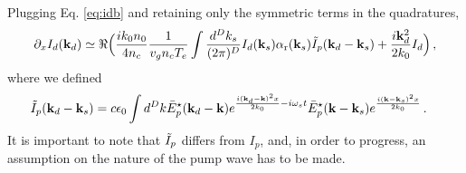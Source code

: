 \documentclass[
 reprint,
 amsmath,amssymb,
 aps,
]{revtex4-1}
\begin{document}
\begin{widetext}
Plugging Eq. \eqref{eq:idb} and retaining only the symmetric terms in the quadratures, 
\begin{align}
\partial_xI_d(\mathbf{k}_d)\simeq \Re\Big( \frac{ik_0n_0}{4n_c} \frac{1 }{  v_g n_c T_e}    \int \frac{d^Dk_s}{(2\pi)^D} I_d(\mathbf{k}_s) \alpha_\mathrm{r}(\mathbf{k}_s)
\Tilde{I}_p(\mathbf{k}_d-\mathbf{k}_s)
+\frac{i\mathbf{k}_d^2}{2k_0} I_d 
\Big)\, , \label{eq:g2}
\end{align}
where we defined 
\begin{align}
\Tilde{I}_p(\mathbf{k}_d-\mathbf{k}_s)  &=  c\epsilon_0  \int d^Dk \Bar{E}_p^\star (\mathbf{k}_d-\mathbf{k})
e^{\frac{ i (\mathbf{k}_d-\mathbf{k})^2x}{2k_0}-i\omega_s t}
\Bar{E}_p^\star(\mathbf{k}-\mathbf{k}_s)
e^{\frac{ i(\mathbf{k}-\mathbf{k}_s)^2x}{2k_0}}   \, . \label{eq:ipt} 
\end{align}
It is important to note that $\Tilde{I}_p$ differs from $I_p$, and, in order to progress, an assumption on the nature of the pump wave has to be made. 


\end{widetext}
\end{document}
